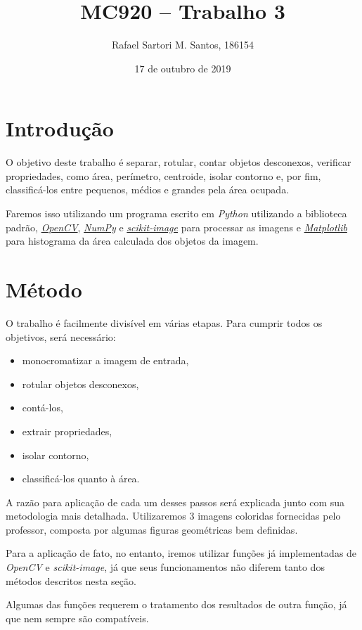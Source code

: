\documentclass[brazilian,a4paper,twocolumn]{article}
\title{MC920 -- Trabalho 3}
\author{Rafael Sartori M. Santos, 186154}
\date{17 de outubro de 2019}
\begin{document}
\maketitle


\section{Introdução}

    O objetivo deste trabalho é separar, rotular, contar objetos desconexos, verificar propriedades, como área, perímetro, centroide, isolar contorno e, por fim, classificá-los entre pequenos, médios e grandes pela área ocupada.

    Faremos isso utilizando um programa escrito em \emph{Python} utilizando a biblioteca padrão, \href{https://opencv.org/}{\emph{OpenCV}}, \href{https://numpy.org/}{\emph{NumPy}} e \href{https://scikit-image.org/}{\emph{scikit-image}} para processar as imagens e \href{https://matplotlib.org/}{\emph{Matplotlib}} para histograma da área calculada dos objetos da imagem.


\section{Método}

    O trabalho é facilmente divisível em várias etapas. Para cumprir todos os objetivos, será necessário:
    \begin{itemize}
        \item monocromatizar a imagem de entrada,
        \item rotular objetos desconexos,
        \item contá-los,
        \item extrair propriedades,
        \item isolar contorno,
        \item classificá-los quanto à área.
    \end{itemize}

    A razão para aplicação de cada um desses passos será explicada junto com sua metodologia mais detalhada. Utilizaremos 3 imagens coloridas fornecidas pelo professor, composta por algumas figuras geométricas bem definidas.

    Para a aplicação de fato, no entanto, iremos utilizar funções já implementadas de \emph{OpenCV} e \emph{scikit-image}, já que seus funcionamentos não diferem tanto dos métodos descritos nesta seção.

    Algumas das funções requerem o tratamento dos resultados de outra função, já que nem sempre são compatíveis.
\end{document}
